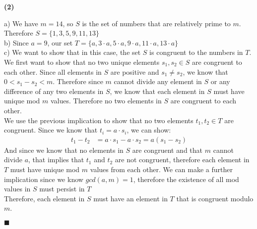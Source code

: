 \documentclass[20pt]{article}
\begin{document}
\noindent
\textbf{(2)}\\
\begin{text}
    a) We have $m = 14$, so $S$ is the set of numbers that are relatively prime to $m$. Therefore $S = \{1, 3, 5, 9, 11, 13\}$\\
    
    \noindent
    b) Since $a = 9$, our set $T = \{a, 3 \cdot a, 5 \cdot a, 9 \cdot a, 11 \cdot a, 13 \cdot a\}$\\
    
    \noindent
    c) We want to show that in this case, the set $S$ is congruent to the numbers in $T$.\\
    
    \noindent
    We first want to show that no two unique elements $s_1, s_2 \in S$ are congruent to each other. Since all elements in $S$ are positive and $s_1 \neq s_2$, we know that $0 < s_1 - s_2 < m$. Therefore since $m$ cannot divide any element in $S$ or any difference of any two elements in $S$, we know that each element in $S$ must have unique mod $m$ values. Therefore no two elements in $S$ are congruent to each other.\\
    
    \noindent
    We use the previous implication to show that no two elements $t_1,t_2 \in T$ are congruent. Since we know that $t_i = a \cdot s_i$, we can show:
    \begin{align}
        t_1 - t_2 &= a \cdot s_1 - a \cdot s_2 = a (s_1 - s_2)\nonumber
    \end{align}
    \noindent
    And since we know that no elements in $S$ are congruent and that $m$ cannot divide $a$, that implies that $t_1$ and $t_2$ are not congruent, therefore each element in $T$ must have unique mod $m$ values from each other. We can make a further implication since we know $gcd(a, m) = 1$, therefore the existence of all mod values in $S$ must persist in $T$\\
    
    \noindent
    Therefore, each element in $S$ must have an element in $T$ that is congruent modulo $m$.
    
    \hfill $\blacksquare$
\end{text}\\
\end{document}
